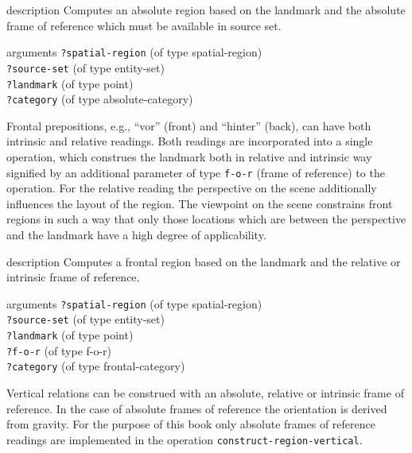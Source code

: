 \begin{explanation}{description}
Computes an absolute region based on the landmark
and the absolute frame of reference which must be available
in source set.
\end{explanation}
\begin{explanation}{arguments}
{\footnotesize\verb+?spatial-region+} (of type spatial-region) \\
{\footnotesize\verb+?source-set+} (of type entity-set) \\
{\footnotesize\verb+?landmark+} (of type point)\\
{\footnotesize\verb+?category+} (of type absolute-category)
\vspace{0.3cm}
\end{explanation}

Frontal prepositions, e.g., ``vor'' (front) and ``hinter'' (back), can have
both intrinsic and relative readings. Both readings are incorporated
into a single operation, which construes the landmark both
in relative and intrinsic way signified by an additional parameter
of type {\footnotesize\tt f-o-r} (frame of reference) to the operation.
For the relative reading the perspective on the scene additionally
influences the layout of the region. The viewpoint on
the scene constrains front regions in such a way that
only those locations which are between the perspective and
the landmark have a high degree of applicability.

\begin{explanation}{description}
Computes a frontal region based on the landmark
and the relative or intrinsic frame of reference.
\end{explanation}
\begin{explanation}{arguments}
{\footnotesize\verb+?spatial-region+} (of type spatial-region) \\
{\footnotesize\verb+?source-set+} (of type entity-set) \\
{\footnotesize\verb+?landmark+} (of type point)\\
{\footnotesize\verb+?f-o-r+} (of type f-o-r)\\
{\footnotesize\verb+?category+} (of type frontal-category)
\vspace{0.3cm}
\end{explanation}

Vertical relations can be construed with an absolute, relative
or intrinsic frame of reference. In the case of absolute frames
of reference the orientation is derived from gravity. For the purpose
of this book only absolute frames of reference readings are
implemented in the operation {\footnotesize\tt construct-region-vertical}.


